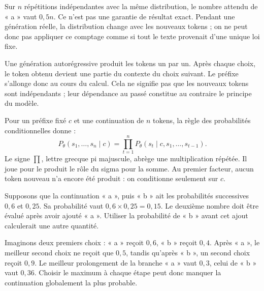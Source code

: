 Sur \(n\) répétitions indépendantes avec la même distribution,
le nombre attendu de « a » vaut \(0{,}5n\). Ce n'est pas
une garantie de résultat exact. Pendant une génération réelle,
la distribution change avec les nouveaux tokens ; on ne peut
donc pas appliquer ce comptage comme si tout le texte provenait
d'une unique loi fixe.



Une génération autorégressive produit les tokens un par un.
Après chaque choix, le token obtenu devient une partie du contexte
du choix suivant. Le préfixe s'allonge donc au cours du calcul.
Cela ne signifie pas que les nouveaux tokens sont indépendants ;
leur dépendance au passé constitue au contraire le principe du modèle.

Pour un préfixe fixé \(c\) et une continuation de \(n\) tokens,
la règle des probabilités conditionnelles donne :
\[
 P_\theta(s_1,\ldots,s_n\mid c)
 =\prod_{t=1}^{n}P_\theta(s_t\mid c,s_1,\ldots,s_{t-1}).
\]
Le signe \(\prod\), lettre grecque pi majuscule, abrège une
multiplication répétée. Il joue pour le produit le rôle du
sigma pour la somme. Au premier facteur, aucun token nouveau
n'a encore été produit : on conditionne seulement sur \(c\).

Supposons que la continuation « a », puis « b » ait les
probabilités successives \(0{,}6\) et \(0{,}25\).
Sa probabilité vaut \(0{,}6\times0{,}25=0{,}15\).
Le deuxième nombre doit être évalué après avoir ajouté « a ».
Utiliser la probabilité de « b » avant cet ajout calculerait
une autre quantité.

Imaginons deux premiers choix : « a » reçoit \(0{,}6\),
« b » reçoit \(0{,}4\). Après « a », le meilleur second
choix ne reçoit que \(0{,}5\), tandis qu'après « b », un
second choix reçoit \(0{,}9\). Le meilleur prolongement de
la branche « a » vaut \(0{,}3\), celui de « b » vaut
\(0{,}36\). Choisir le maximum à chaque étape peut donc
manquer la continuation globalement la plus probable.

